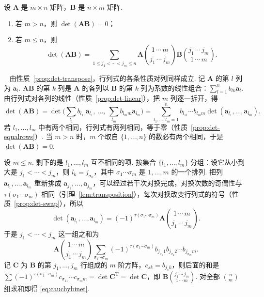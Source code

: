 \documentclass[lang=cn,10.5pt,scheme=chinese,toc=twocol,section,chinesefont=nofont,
twoside,citestyle=gb7714-2015,bibstyle=gb7714-2015]{elegantbook}
\newcommand{\vv}[1]{\boldsymbol{#1}}
\newcommand{\trans}{\mathrm{T}}             %
\numberwithin{equation}{section}   %
\newcommand*{\lnlabel}[1]{{\sffamily\bfseries\color{black}#1}}
\renewenvironment{proof}{%
	\par\noindent\lnlabel{\proofname}\;\ \color{black!90}\cfs}{\par}
\begin{document}
\begin{theorem}\label{thm:cauchybinet}
  设 $\vv A$ 是 $m\times n$ 矩阵，$\vv B$ 是 $n\times m$ 矩阵.
  \begin{enumerate}
    \item 若 $m>n$，则 $\det(\vv{AB})=0$；
    \item 若 $m\le n$，则
          \begin{equation}
            \label{eq:cauchybinet}
            \det(\vv{AB})=\sum_{1\le j_1<\cdots<j_m\le n}\vv A\binom{1\,\cdots\,m}{j_1\,\cdots\,j_m}\vv B\binom{j_1\,\cdots\,j_m}{1\,\cdots\,m}.
          \end{equation}
  \end{enumerate}
\end{theorem}
\begin{proof}
  由性质~\ref{prop:det-transpose}，行列式的各条性质对列同样成立. 记 $\vv A$ 的第 $l$ 列为 $\vv a_l$. $\vv{AB}$ 的第 $k$ 列是 $\vv A$ 的各列以 $\vv B$ 的第 $k$ 列为系数的线性组合：$\sum_{l=1}^nb_{lk}\vv a_l$. 由行列式对各列的线性（性质~\ref{prop:det-linear}），把 $m$ 列逐一拆开，得
  \[
    \det(\vv{AB})=\det\Big(\sum_{l_1}b_{l_11}\vv a_{l_1},\ \ldots,\ \sum_{l_m}b_{l_mm}\vv a_{l_m}\Big)=\sum_{l_1,\ldots,l_m=1}^nb_{l_11}\cdots b_{l_mm}\det(\vv a_{l_1},\ldots,\vv a_{l_m}).
  \]
  若 $l_1,\ldots,l_m$ 中有两个相同，行列式有两列相同，等于零（性质~\ref{prop:det-equalrows}）. 当 $m>n$ 时，$m$ 个取自 $\{1,\ldots,n\}$ 的数必有两个相同，于是 $\det(\vv{AB})=0$.

  设 $m\le n$. 剩下的是 $l_1,\ldots,l_m$ 互不相同的项. 按集合 $\{l_1,\ldots,l_m\}$ 分组：设它从小到大是 $j_1<\cdots<j_m$，则 $l_k=j_{\sigma_k}$，其中 $\sigma_1\cdots\sigma_m$ 是 $1,\ldots,m$ 的一个排列. 把列 $\vv a_{l_1},\ldots,\vv a_{l_m}$ 重新排成 $\vv a_{j_1},\ldots,\vv a_{j_m}$，可以经过若干次对换完成，对换次数的奇偶性与 $\tau(\sigma_1\cdots\sigma_m)$ 相同（引理~\ref{lem:transposition}），每次对换改变行列式的符号（性质~\ref{prop:det-swap}），所以
  \[
    \det(\vv a_{l_1},\ldots,\vv a_{l_m})=(-1)^{\tau(\sigma_1\cdots\sigma_m)}\vv A\binom{1\,\cdots\,m}{j_1\,\cdots\,j_m}.
  \]
  于是 $j_1<\cdots<j_m$ 这一组之和为
  \[
    \vv A\binom{1\,\cdots\,m}{j_1\,\cdots\,j_m}\sum_{\sigma_1\cdots\sigma_m}(-1)^{\tau(\sigma_1\cdots\sigma_m)}b_{j_{\sigma_1}1}b_{j_{\sigma_2}2}\cdots b_{j_{\sigma_m}m}.
  \]
  记 $\vv C$ 为 $\vv B$ 的第 $j_1,\ldots,j_m$ 行组成的 $m$ 阶方阵，$c_{sk}=b_{j_sk}$，则后面的和是 $\sum(-1)^{\tau(\sigma_1\cdots\sigma_m)}c_{\sigma_11}\cdots c_{\sigma_mm}=\det\vv C^\trans=\det\vv C$，即 $\vv B\binom{j_1\,\cdots\,j_m}{1\,\cdots\,m}$. 对全部 $\binom nm$ 组求和即得 \eqref{eq:cauchybinet}.
\end{proof}
\end{document}
